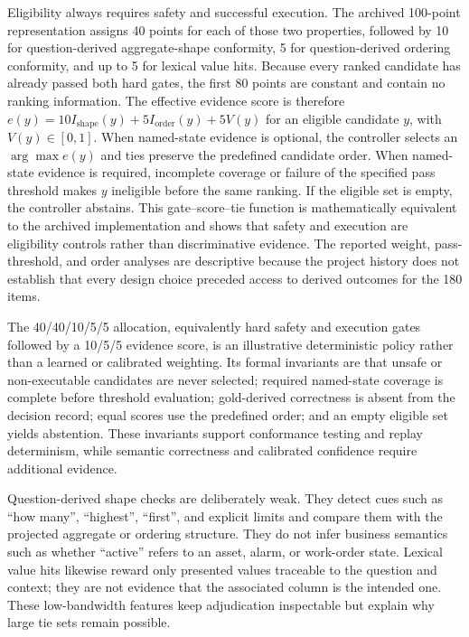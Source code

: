 \documentclass[applsci,article,submit,moreauthors]{Definitions/mdpi}
\begin{document}
Eligibility always requires safety and successful execution. The archived 100-point representation assigns 40 points for each of those two properties, followed by 10 for question-derived aggregate-shape conformity, 5 for question-derived ordering conformity, and up to 5 for lexical value hits. Because every ranked candidate has already passed both hard gates, the first 80 points are constant and contain no ranking information. The effective evidence score is therefore $e(y)=10I_{\mathrm{shape}}(y)+5I_{\mathrm{order}}(y)+5V(y)$ for an eligible candidate $y$, with $V(y)\in[0,1]$. When named-state evidence is optional, the controller selects an $\arg\max e(y)$ and ties preserve the predefined candidate order. When named-state evidence is required, incomplete coverage or failure of the specified pass threshold makes $y$ ineligible before the same ranking. If the eligible set is empty, the controller abstains. This gate--score--tie function is mathematically equivalent to the archived implementation and shows that safety and execution are eligibility controls rather than discriminative evidence. The reported weight, pass-threshold, and order analyses are descriptive because the project history does not establish that every design choice preceded access to derived outcomes for the 180 items.

The 40/40/10/5/5 allocation, equivalently hard safety and execution gates followed by a 10/5/5 evidence score, is an illustrative deterministic policy rather than a learned or calibrated weighting. Its formal invariants are that unsafe or non-executable candidates are never selected; required named-state coverage is complete before threshold evaluation; gold-derived correctness is absent from the decision record; equal scores use the predefined order; and an empty eligible set yields abstention. These invariants support conformance testing and replay determinism, while semantic correctness and calibrated confidence require additional evidence.

Question-derived shape checks are deliberately weak. They detect cues such as ``how many'', ``highest'', ``first'', and explicit limits and compare them with the projected aggregate or ordering structure. They do not infer business semantics such as whether ``active'' refers to an asset, alarm, or work-order state. Lexical value hits likewise reward only presented values traceable to the question and context; they are not evidence that the associated column is the intended one. These low-bandwidth features keep adjudication inspectable but explain why large tie sets remain possible.
\end{document}
